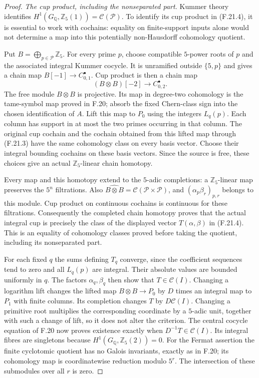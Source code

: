 \begin{proof}
\emph{The cup product, including the nonseparated part.}
Kummer theory identifies
$H^1(G_{\mathbb Q},\mathbb Z_5(1))=\mathcal C(\mathcal P)$.
To identify its cup product in (F.21.4), it is essential
to work with cochains: equality on finite-support inputs
alone would not determine a map into this potentially
non-Hausdorff cohomology quotient.

Put $B=\bigoplus_{p\in\mathcal P}\mathbb Z_5$. For every
prime $p$, choose compatible $5$-power roots of $p$ and
the associated integral Kummer cocycle. It is unramified
outside $\{5,p\}$ and gives a chain map
$B[-1]\to C_{0,1}^{\bullet}$. Cup product is then a
chain map
\[
                 (B\otimes B)[-2]\longrightarrow C_{0,2}^{\bullet}.
\]
The free module $B\otimes B$ is projective. Its map in
degree-two cohomology is the tame-symbol map proved in
F.20; absorb the fixed Chern-class sign into the chosen
identification of $A$. Lift this map to $P_0$ using the
integers $L_q(p)$. Each column has support in at most
the two primes occurring in that column. The original
cup cochain and the cochain obtained from this lifted
map through (F.21.3) have the same cohomology class on
every basis vector. Choose their integral bounding
cochains on these basis vectors. Since the source is
free, these choices give an actual $\mathbb Z_5$-linear
chain homotopy.

Every map and this homotopy extend to the $5$-adic
completions: a $\mathbb Z_5$-linear map preserves the
$5^n$ filtrations. Also
$\widehat{B\otimes B}=\mathcal C(\mathcal P\times\mathcal P)$,
and $(\alpha_p\beta_r)_{p,r}$ belongs to this module.
Cup product on continuous cochains is continuous for
these filtrations. Consequently the completed chain
homotopy proves that the actual integral cup is precisely
the class of the displayed vector $T(\alpha,\beta)$
in (F.21.4). This is an equality of cohomology classes
proved before taking the quotient, including its
nonseparated part.

For each fixed $q$ the sums defining $T_q$ converge,
since the coefficient sequences tend to zero and all
$L_q(p)$ are integral. Their absolute values are bounded
uniformly in $q$. The factors $\alpha_q,\beta_q$ then
show that $T\in\mathcal C(I)$. Changing a logarithm lift
changes the lifted map $B\otimes B\to P_0$ by $D$ times
an integral map to $P_1$ with finite columns. Its
completion changes $T$ by $D\mathcal C(I)$.
Changing a primitive root multiplies the corresponding
coordinate by a $5$-adic unit, together with such a
change of lift, so it does not alter the criterion.
The central cocycle equation of F.20 now proves
existence exactly when $D^{-1}T\in\mathcal C(I)$.
Its integral fibres are singletons because
$H^1(G_{\mathbb Q},\mathbb Z_5(2))=0$.
For the Fermat assertion the finite cyclotomic quotient
has no Galois invariants, exactly as in F.20; its
cohomology map is coordinatewise reduction modulo
$5^r$. The intersection of these submodules over
all $r$ is zero.


\end{proof}
